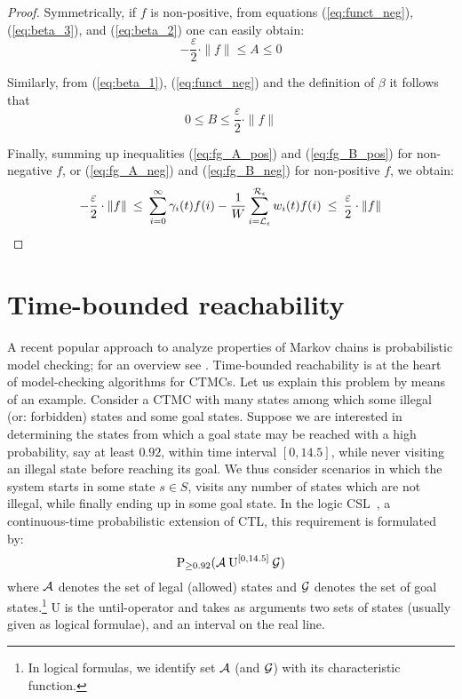 \documentclass{entcs}
\newcommand{\Section}[1]{\section{#1}}
\begin{document}
{\begin{proof}
		Symmetrically, if $f$ is non-positive, from equations (\ref{eq:funct_neg}), (\ref{eq:beta_3}), and (\ref{eq:beta_2}) one can easily obtain:
		\begin{equation}
			- \frac{\varepsilon}{2} \cdot \|f\| \leq A \leq 0
			\label{eq:fg_A_neg}
		\end{equation}
		
		Similarly, from (\ref{eq:beta_1}), (\ref{eq:funct_neg}) and the definition of $\beta$ it follows that
		\begin{equation}
			0 \leq B \leq \frac{\varepsilon}{2} \cdot \|f\|
			\label{eq:fg_B_neg}
		\end{equation}
		
		Finally, summing up inequalities (\ref{eq:fg_A_pos}) and (\ref{eq:fg_B_pos}) for non-negative $f$, or (\ref{eq:fg_A_neg}) and (\ref{eq:fg_B_neg}) for non-positive $f$, we obtain:
		\[
			- \frac{\varepsilon}{2} \cdot \|f\| \: \leq \: \sum_{i=0}^{\infty} \gamma_{i}(t) f(i) - \frac{1}{W}\sum_{i = \mathcal{L}_{\epsilon}}^{\mathcal{R}_{\epsilon}} w_{i}(t) f(i) \: \leq \: \frac{\varepsilon}{2} \cdot \|f\|
		\]
	\end{proof}
	}

\Section{Time-bounded reachability \label{s:time_b_r}}

		A recent popular approach to analyze properties of Markov chains is probabilistic model checking; for an overview see \cite{Kwiatkowska_SLCS03}.  Time-bounded reachability is at the heart of model-checking algorithms for CTMCs.  Let us explain this problem by means of an example. Consider a CTMC with many states among which some illegal (or: forbidden) states and some goal states.  Suppose we are interested in determining the states from which a goal state may be reached with a high probability, say at least $0.92$, within time interval $[0,14.5]$, while never visiting an illegal state before reaching its goal. We thus consider scenarios in which the system starts in some state $s \in S$, visits any number of states which are not illegal, while finally ending up in some goal state.  In the logic CSL~\cite{AzizSSB_ACMTCL00,BaierHHK_TSE03}, a continuous-time probabilistic extension of CTL,  this requirement is formulated by:
		\[
			\mathrm{P}_{\geq 0.92}(\mathcal{A} \: \mathrm{U}^{[0,14.5]} \: \mathcal{G})
		\]
		where $\mathcal{A}$ denotes the set of legal (allowed) states and $\mathcal{G}$ denotes the set of goal states.\footnote{In logical formulas, we identify set $\mathcal{A}$ (and $\mathcal{G}$) with its characteristic function.} $\mathrm{U}$ is the until-operator and takes as arguments two sets of states (usually given as logical formulae), and an interval on the real line.
		
\end{document}
